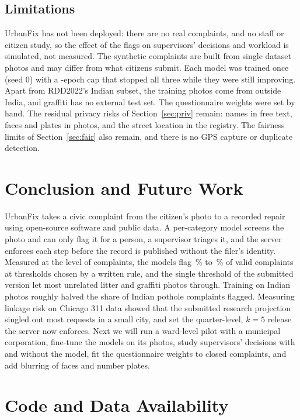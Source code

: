 \documentclass{ieeeaccess}
\begin{document}
\subsection{Limitations}

UrbanFix has not been deployed: there are no real complaints, and no staff or citizen study, so the effect of the flags on supervisors' decisions and workload is simulated, not measured. The synthetic complaints are built from single dataset photos and may differ from what citizens submit. Each model was trained once (seed 0) with a \nMaxEpochs-epoch cap that stopped all three while they were still improving. Apart from RDD2022's Indian subset, the training photos come from outside India, and graffiti has no external test set. The questionnaire weights were set by hand. The residual privacy risks of Section~\ref{sec:priv} remain: names in free text, faces and plates in photos, and the street location in the registry. The fairness limits of Section~\ref{sec:fair} also remain, and there is no GPS capture or duplicate detection.

\section{Conclusion and Future Work}\label{sec:conc}

UrbanFix takes a civic complaint from the citizen's photo to a recorded repair using open-source software and public data. A per-category model screens the photo and can only flag it for a person, a supervisor triages it, and the server enforces each step before the record is published without the filer's identity. Measured at the level of complaints, the models flag \nFlagMin\,\% to \nFlagMax\,\% of valid complaints at thresholds chosen by a written rule, and the single threshold of the submitted version let most unrelated litter and graffiti photos through. Training on Indian photos roughly halved the share of Indian pothole complaints flagged. Measuring linkage risk on Chicago 311 data showed that the submitted research projection singled out most requests in a small city, and set the quarter-level, $k=5$ release the server now enforces. Next we will run a ward-level pilot with a municipal corporation, fine-tune the models on its photos, study supervisors' decisions with and without the model, fit the questionnaire weights to closed complaints, and add blurring of faces and number plates.

\section*{Code and Data Availability}
\end{document}
